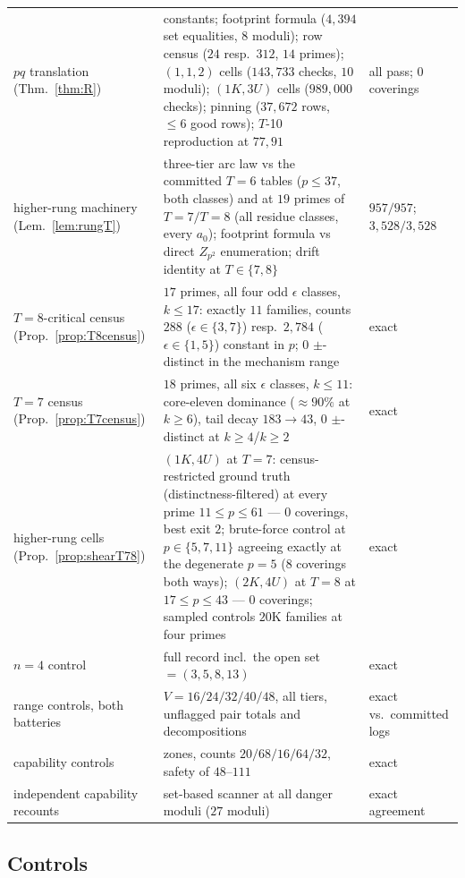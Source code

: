 \begin{longtable}{@{}p{3.7cm}>{\raggedright\arraybackslash}p{8.2cm}>{\raggedright\arraybackslash}p{3.1cm}@{}}
$pq$ translation (Thm.~\ref{thm:R}) & constants; footprint formula
  ($4{,}394$ set equalities, $8$ moduli); row census ($24$ resp.\ $312$,
  $14$ primes); $(1,1,2)$ cells ($143{,}733$ checks, $10$ moduli);
  $(1K,3U)$ cells ($989{,}000$ checks); pinning ($37{,}672$ rows,
  $\le6$ good rows); $T$-10 reproduction at $77,91$ &
  all pass; $0$ coverings \\
higher-rung machinery (Lem.~\ref{lem:rungT}) & three-tier arc law vs the
  committed $T=6$ tables ($p\le37$, both classes) and at $19$ primes of
  $T=7/T=8$ (all residue classes, every $a_0$); footprint formula vs
  direct $Z_{p^2}$ enumeration; drift identity at $T\in\{7,8\}$ &
  $957/957$; $3{,}528/3{,}528$ \\
$T=8$-critical census (Prop.~\ref{prop:T8census}) & $17$ primes, all four
  odd $\epsilon$ classes, $k\le17$: exactly $11$ families, counts
  $288$ ($\epsilon\in\{3,7\}$) resp.\ $2{,}784$ ($\epsilon\in\{1,5\}$)
  constant in $p$; $0$ $\pm$-distinct in the mechanism range & exact \\
$T=7$ census (Prop.~\ref{prop:T7census}) & $18$ primes, all six
  $\epsilon$ classes, $k\le11$: core-eleven dominance ($\approx90\%$ at
  $k\ge6$), tail decay $183\to43$, $0$ $\pm$-distinct at $k\ge4$/$k\ge2$ &
  exact \\
higher-rung cells (Prop.~\ref{prop:shearT78}) & $(1K,4U)$ at $T=7$:
  census-restricted ground truth (distinctness-filtered) at every prime
  $11\le p\le61$ --- $0$ coverings, best exit $2$; brute-force control at
  $p\in\{5,7,11\}$ agreeing exactly at the degenerate $p=5$ ($8$
  coverings both ways); $(2K,4U)$ at $T=8$ at $17\le p\le43$ --- $0$
  coverings; sampled controls $20$K families at four primes & exact \\
\midrule
$n=4$ control & full record incl.\ the open set $=(3,5,8,13)$ &
  exact \\
range controls, both batteries & $V=16/24/32/40/48$, all tiers, unflagged
  pair totals and decompositions & exact vs.\ committed logs \\
capability controls & zones, counts $20/68/16/64/32$, safety of
  $48$--$111$ & exact \\
independent capability recounts & set-based scanner at all danger moduli
  ($27$ moduli) & exact agreement \\
\end{longtable}
\endgroup

\subsection{Controls}

